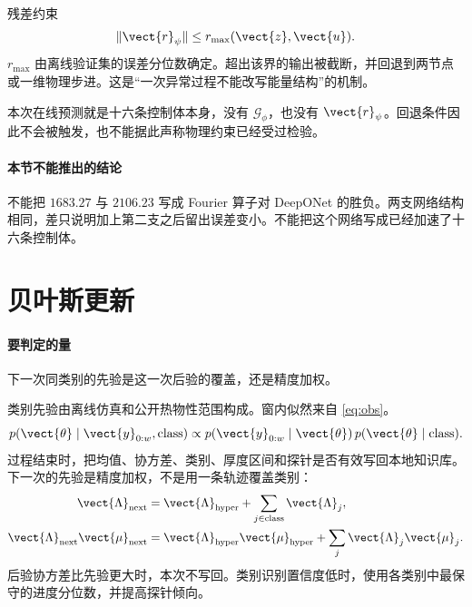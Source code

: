 残差约束
\begin{equation}
\label{eq:bnp}
\|\vect{r}_{\psi}\|\le r_{\max}(\vect{z},\vect{u}).
\end{equation}
\(r_{\max}\) 由离线验证集的误差分位数确定。超出该界的输出被截断，并回退到两节点或一维物理步进。这是“一次异常过程不能改写能量结构”的机制。

本次在线预测就是十六条控制体本身，没有 \(\mathcal{G}_{\phi}\)，也没有 \(\vect{r}_{\psi}\)。回退条件因此不会被触发，也不能据此声称物理约束已经受过检验。

\paragraph{本节不能推出的结论}
不能把 \(1683.27\) 与 \(2106.23\) 写成 Fourier 算子对 DeepONet 的胜负。两支网络结构相同，差只说明加上第二支之后留出误差变小。不能把这个网络写成已经加速了十六条控制体。

\section{贝叶斯更新}

\paragraph{要判定的量}
下一次同类别的先验是这一次后验的覆盖，还是精度加权。

类别先验由离线仿真和公开热物性范围构成。窗内似然来自 \eqref{eq:obs}。
\begin{equation}
\label{eq:bayes}
p(\vect{\theta}\mid\vect{y}_{0:w},\mathrm{class})
\propto p(\vect{y}_{0:w}\mid\vect{\theta})\,p(\vect{\theta}\mid\mathrm{class}).
\end{equation}
过程结束时，把均值、协方差、类别、厚度区间和探针是否有效写回本地知识库。下一次的先验是精度加权，不是用一条轨迹覆盖类别：
\begin{equation}
\label{eq:hier}
\begin{aligned}
\vect{\Lambda}_{\mathrm{next}}&=\vect{\Lambda}_{\mathrm{hyper}}+\sum_{j\in\mathrm{class}}\vect{\Lambda}_{j},\\
\vect{\Lambda}_{\mathrm{next}}\vect{\mu}_{\mathrm{next}}
&=\vect{\Lambda}_{\mathrm{hyper}}\vect{\mu}_{\mathrm{hyper}}+\sum_{j}\vect{\Lambda}_{j}\vect{\mu}_{j}.
\end{aligned}
\end{equation}
后验协方差比先验更大时，本次不写回。类别识别置信度低时，使用各类别中最保守的进度分位数，并提高探针倾向。

